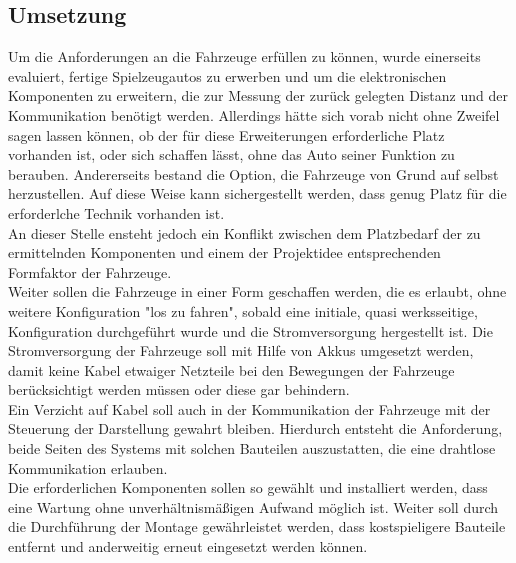 \documentclass[.../Dokumentation.tex]{subfiles}
\begin{document}
\subsection{Umsetzung}\label{sec-concept-execution}
Um die Anforderungen an die Fahrzeuge erfüllen zu können, wurde 
einerseits evaluiert, fertige Spielzeugautos zu erwerben und um die 
elektronischen Komponenten zu erweitern, die zur Messung der zurück gelegten 
Distanz und der Kommunikation benötigt werden. Allerdings hätte sich vorab 
nicht ohne Zweifel sagen lassen können, ob der für diese Erweiterungen 
erforderliche Platz vorhanden ist, oder sich schaffen lässt, ohne das Auto 
seiner Funktion zu berauben. 
Andererseits bestand die Option, die Fahrzeuge von 
Grund auf selbst herzustellen. 
Auf diese Weise kann sichergestellt werden, 
dass genug Platz für die erforderlche Technik vorhanden ist.\\
An dieser Stelle ensteht jedoch ein Konflikt zwischen dem Platzbedarf der zu 
ermittelnden Komponenten und 
einem der Projektidee entsprechenden Formfaktor der Fahrzeuge.\\
Weiter sollen die Fahrzeuge in einer Form geschaffen werden, die es erlaubt, 
ohne weitere Konfiguration "los zu fahren", sobald eine initiale, 
quasi werksseitige, Konfiguration durchgeführt wurde und die Stromversorgung 
hergestellt ist. 
Die Stromversorgung der Fahrzeuge soll mit Hilfe von Akkus umgesetzt werden, 
damit keine Kabel etwaiger Netzteile bei den Bewegungen der Fahrzeuge 
berücksichtigt werden müssen oder diese gar behindern.\\
Ein Verzicht auf Kabel soll auch in der Kommunikation der Fahrzeuge mit 
der Steuerung der Darstellung gewahrt bleiben.
Hierdurch entsteht die Anforderung, beide Seiten des Systems mit solchen 
Bauteilen auszustatten, die eine drahtlose Kommunikation erlauben.\\
Die erforderlichen Komponenten sollen so gewählt und installiert werden, 
dass eine Wartung ohne unverhältnismäßigen Aufwand möglich ist. Weiter soll 
durch die Durchführung der Montage gewährleistet werden, dass kostspieligere 
Bauteile entfernt und anderweitig erneut eingesetzt werden können.
\end{document}
